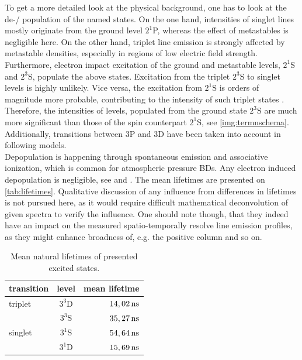 \documentclass[a4paper,10pt,twoside]{article}
\begin{document}
			To get a more detailed look at the physical background, one has to look at the de-/ population of the named states. On the one hand, intensities of singlet lines mostly originate from the ground level $2^1$P, whereas the effect of metastables is negligible here. On the other hand, triplet line emission is strongly affected by metastable densities, especially in regions of low electric field strength. Furthermore, electron impact excitation of the ground and metastable levels, $2^1$S and $2^3$S, populate the above states. Excitation from the triplet $2^3$S to singlet levels is highly unlikely. Vice versa, the excitation from $2^1$S is orders of magnitude more probable, contributing to the intensity of such triplet states \cite{linratio1_14}. Therefore, the intensities of levels, populated from the ground state $2^3$S are much more significant than those of the spin counterpart $2^1$S, see \autoref{img:termnschema}. Additionally, transitions between 3P and 3D have been taken into account in following models.\\
			Depopulation is happening through spontaneous emission and associative ionization, which is common for atmospheric pressure BDs. Any electron induced depopulation is negligible, see \cite{PhysRevA.21.188} and \cite{0963-0252-14-4-011}. The mean lifetimes are presented on \autoref{tab:lifetimes}. Qualitative discussion of any influence from differences in lifetimes is not pursued here, as it would require difficult mathematical deconvolution of given spectra to verify the influence. One should note though, that they indeed have an impact on the measured spatio-temporally resolve line emission profiles, as they might enhance broadness of, e.g. the positive column and so on.
			
				\begin{table}[t!]
					\centering
					\begin{tabular}{l|c|r}
						transition & level & mean lifetime \\ \hline \hline
						triplet & $3^3$D & $\unit[14,02]{ns}$ \\ \cline{2-3}
						 & $3^3$S & $\unit[35,27]{ns}$ \\ \hline
						 singlet & $3^1$S & $\unit[54,64]{ns}$ \\ \cline{2-3}
						 & $3^1$D & $\unit[15,69]{ns}$
					\end{tabular}
					\caption{Mean natural lifetimes of presented excited states. \cite{lifetimes} \cite{linratio1_14}}
					\label{tab:lifetimes}
				\end{table}
			
\end{document}
